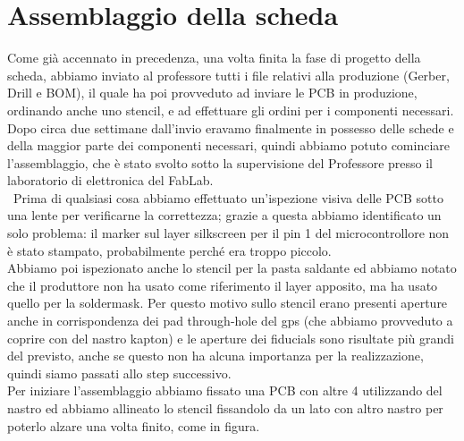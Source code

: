 \chapter{Assemblaggio della scheda}

Come già accennato in precedenza, una volta finita la fase di progetto della scheda, abbiamo inviato al professore tutti i file relativi alla produzione (Gerber, Drill e BOM), il quale ha poi provveduto ad inviare le PCB in produzione, ordinando anche uno stencil, e ad effettuare gli ordini per i componenti necessari.
Dopo circa due settimane dall’invio eravamo finalmente in possesso delle schede e della maggior parte dei componenti necessari, quindi abbiamo potuto cominciare l’assemblaggio, che è stato svolto sotto la supervisione del Professore presso il laboratorio di elettronica del FabLab. \\\
Prima di qualsiasi cosa abbiamo effettuato un’ispezione visiva delle PCB sotto una lente per verificarne la correttezza; grazie a questa abbiamo identificato un solo problema: il marker sul layer silkscreen per il pin 1 del microcontrollore non è stato stampato, probabilmente perché era troppo piccolo. \\
Abbiamo poi ispezionato anche lo stencil per la pasta saldante ed abbiamo notato che il produttore non ha usato come riferimento il layer apposito, ma ha usato quello per la soldermask. Per questo motivo sullo stencil erano presenti aperture anche in corrispondenza dei pad through-hole del gps (che abbiamo provveduto a coprire con del nastro kapton) e le aperture dei fiducials sono risultate più grandi del previsto, anche se questo non ha alcuna importanza per la realizzazione, quindi siamo passati allo step successivo. \\
Per iniziare l’assemblaggio abbiamo fissato una PCB con altre 4 utilizzando del nastro ed abbiamo allineato lo stencil fissandolo da un lato con altro nastro per poterlo alzare una volta finito, come in figura.

